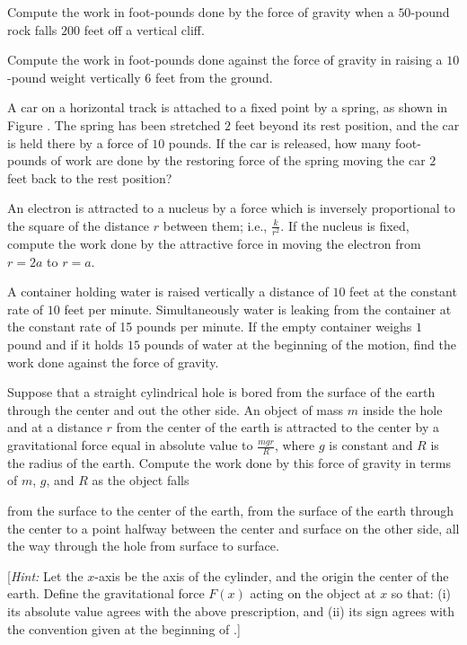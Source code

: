 \begin{exercises}

Compute the work in foot-pounds done by
the force of gravity when a $50$-pound
rock falls $200$ feet off a vertical cliff.

Compute the work in foot-pounds done against
the force of gravity in raising a $10$-pound weight
vertically $6$ feet from the ground.

A car on a horizontal track is attached to a fixed
point by a spring, as shown in Figure
.  The spring has been stretched
$2$ feet beyond its rest position, and the
car is held there by a force of $10$ pounds.
If the car is released, how many foot-pounds
of work are done by the restoring force of
the spring moving the car $2$ feet back
to the rest position?

An electron is attracted to a nucleus by a
force which is inversely proportional to the
square of the distance $r$ between them; i.e.,
$\frac{k}{r^2}$.  If the nucleus is fixed,
compute the work done by the attractive
force in moving the electron from $r=2a$
to $r=a$.

A container holding water is raised vertically
a distance of $10$ feet at the constant
rate of $10$ feet per minute.
Simultaneously water is leaking from the container
at the constant rate of 15 pounds per minute.
If the empty container weighs $1$ pound
and if it holds $15$ pounds of water at the beginning
of the motion, find the work done against
the force of gravity.

Suppose that a straight cylindrical hole is bored
from the surface of the earth through the center
and out the other side.
An object of mass $m$ inside the hole and at a
distance $r$ from the center of the earth is
attracted to the center by a gravitational
force equal in absolute value to $\frac{mgr}{R}$,
where $g$ is constant and $R$ is the radius
of the earth.  Compute the work done by this
force of gravity in terms of
$m$, $g$, and $R$ as the object falls
\begin{exenum}
\x
from the surface to the center of the earth,
\x
from the surface of the earth through the center
to a point halfway between the center and surface
on the other side,
\x
all the way through the hole from surface to surface.
\end{exenum}
[\emph{Hint:} Let the $x$-axis be the axis of the
cylinder, and the origin the center of the earth.
Define the gravitational force $F(x)$ acting on the
object at $x$ so that:
(i) its absolute value agrees with the above
prescription, and (ii) its sign agrees with the
convention given at the beginning of .]


\end{exercises}
